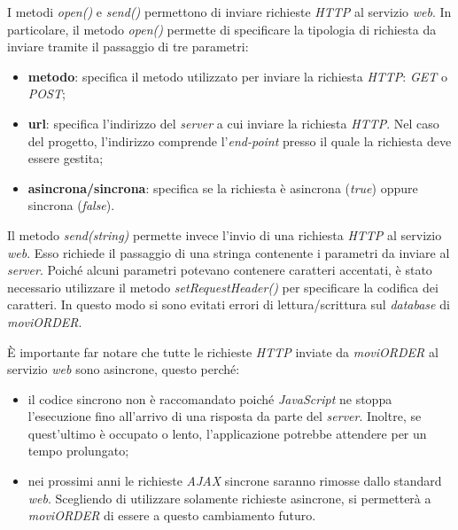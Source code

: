 I metodi \textit{open()} e \textit{send()} permettono di inviare richieste \textit{HTTP} al servizio \textit{web}. In particolare, il metodo \textit{open()} permette di specificare la tipologia di richiesta da inviare tramite il passaggio di tre parametri:
	\begin{itemize}
		\item \textbf{metodo}: specifica il metodo utilizzato per inviare la richiesta \textit{HTTP}: \textit{GET} o \textit{POST};
		\item \textbf{url}: specifica l'indirizzo del \textit{server} a cui inviare la richiesta \textit{HTTP}. Nel caso del progetto, l'indirizzo comprende l'\textit{end-point} presso il quale la richiesta deve essere gestita;
		\item \textbf{asincrona/sincrona}: specifica se la richiesta è asincrona (\textit{true}) oppure sincrona (\textit{false}).
	\end{itemize}
Il metodo \textit{send(string)} permette invece l'invio di una richiesta \textit{HTTP} al servizio \textit{web}. Esso richiede il passaggio di una stringa contenente i parametri da inviare al \textit{server}. Poiché alcuni parametri potevano contenere caratteri accentati, è stato necessario utilizzare il metodo \textit{setRequestHeader()} per specificare la codifica dei caratteri. In questo modo si sono evitati errori di lettura/scrittura sul \textit{database} di \textit{moviORDER}. 

È importante far notare che tutte le richieste \textit{HTTP} inviate da \textit{moviORDER} al servizio \textit{web} sono asincrone, questo perché:
\begin{itemize}
	\item il codice sincrono non è raccomandato poiché \textit{JavaScript} ne stoppa l'esecuzione fino all'arrivo di una risposta da parte del \textit{server}. Inoltre, se quest'ultimo è occupato o lento, l'applicazione potrebbe attendere per un tempo prolungato;
	\item nei prossimi anni le richieste \textit{AJAX} sincrone saranno rimosse dallo standard \textit{web}. Scegliendo di utilizzare solamente richieste asincrone, si permetterà a \textit{moviORDER} di essere  a questo cambiamento futuro.
\end{itemize} 

